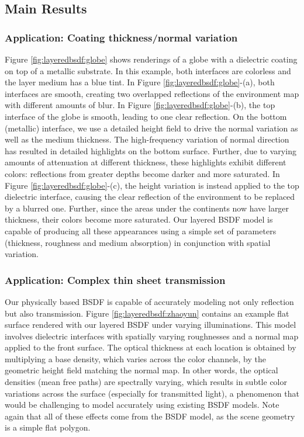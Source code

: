 


\subsection{Main Results}
\label{subsec:res_main}

\subsubsection{Application: Coating thickness/normal variation}

Figure \ref{fig:layeredbsdf:globe} shows renderings of a globe with a dielectric coating on top of a metallic substrate.
In this example, both interfaces are colorless and the layer medium has a blue tint.
In Figure \ref{fig:layeredbsdf:globe}-(a), both interfaces are smooth, creating two overlapped reflections of the environment map with different amounts of blur.
In Figure \ref{fig:layeredbsdf:globe}-(b), the top interface of the globe is smooth, leading to one clear reflection.
On the bottom (metallic) interface, we use a detailed height field to drive the normal variation as well as the medium thickness.
The high-frequency variation of normal direction has resulted in detailed highlights on the bottom surface.
Further, due to varying amounts of attenuation at different thickness, these highlights exhibit different colors: reflections from greater depths become darker and more saturated. 
In Figure \ref{fig:layeredbsdf:globe}-(c), the height variation is instead applied to the top dielectric interface, causing the clear reflection of the environment to be replaced by a blurred one.
Further, since the areas under the continents now have larger thickness, their colors become more saturated.
Our layered BSDF model is capable of producing all these appearances using a simple set of parameters (thickness, roughness and medium absorption) in conjunction with spatial variation.

 

\subsubsection{Application: Complex thin sheet transmission}

Our physically based BSDF is capable of accurately modeling not only reflection but also transmission.
Figure \ref{fig:layeredbsdf:zhaoyun} contains an example flat surface rendered with our layered BSDF under varying illuminations.
This model involves dielectric interfaces with spatially varying roughnesses and a normal map applied to the front surface.
The optical thickness at each location is obtained by multiplying a base density, which varies across the color channels, by the geometric height field matching the normal map.
In other words, the optical densities (mean free paths) are spectrally varying, which results in subtle color variations across the surface (especially for transmitted light), a phenomenon that would be challenging to model accurately using existing BSDF models. Note again that all of these effects come from the BSDF model, as the scene geometry is a simple flat polygon.

